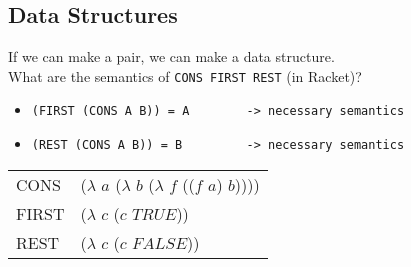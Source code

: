 \documentclass{article}
\begin{document}
 \subsection{Data Structures}
 If we can make a pair, we can make a data structure.\\
 What are the semantics of \verb|CONS FIRST REST| (in Racket)?\\
 \begin{itemize}
  \item[] \verb|(FIRST (CONS A B)) = A        -> necessary semantics|
  \item[] \verb|(REST (CONS A B)) = B         -> necessary semantics|
 \end{itemize}
 \bigskip
\begin{tabular}{l l}
 CONS & ($\lambda$ $\mathit{a}$ ($\lambda$ $\mathit{b}$ ($\lambda$ $\mathit{f}$ (($\mathit{f}$ $\mathit{a}$) $\mathit{b}$))))\\
 FIRST & ($\lambda$ $\mathit{c}$ ($\mathit{c}$ $\mathit{TRUE}$))\\
 REST & ($\lambda$ $\mathit{c}$ ($\mathit{c}$ $\mathit{FALSE}$))\\
\end{tabular}
\end{document}
